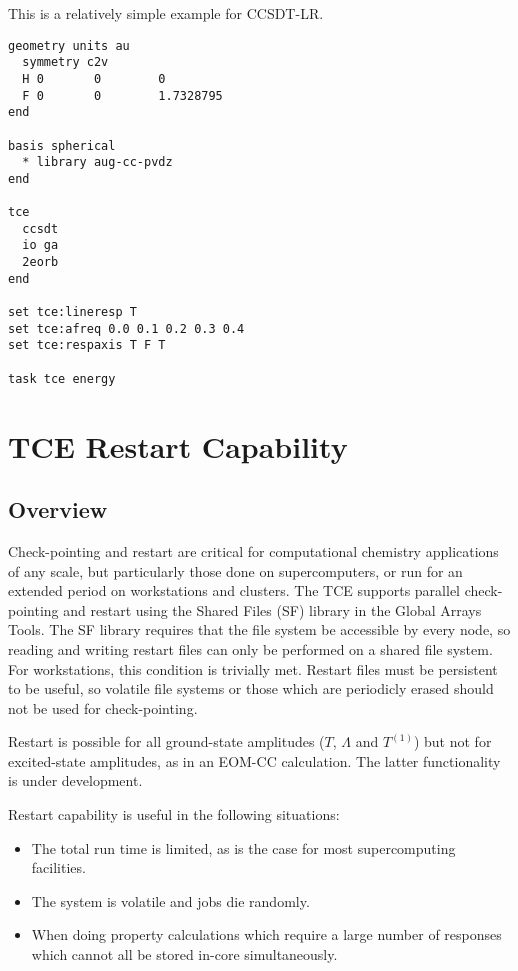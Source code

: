 This is a relatively simple example for CCSDT-LR.

\begin{verbatim}
geometry units au
  symmetry c2v
  H 0       0        0
  F 0       0        1.7328795
end

basis spherical
  * library aug-cc-pvdz
end

tce
  ccsdt
  io ga
  2eorb
end

set tce:lineresp T
set tce:afreq 0.0 0.1 0.2 0.3 0.4
set tce:respaxis T F T

task tce energy
\end{verbatim}

\section{TCE Restart Capability}

\subsection{Overview}

Check-pointing and restart are critical for computational chemistry applications of any scale, but particularly those done on supercomputers, or run for an extended period on workstations and clusters.  The TCE supports parallel check-pointing and restart using the Shared Files (SF) library in the Global Arrays Tools.  The SF library requires that the file system be accessible by every node, so reading and writing restart files can only be performed on a shared file system.  For workstations, this condition is trivially met.  Restart files must be persistent to be useful, so volatile file systems or those which are periodicly erased should not be used for check-pointing.

Restart is possible for all ground-state amplitudes ($T$, $\Lambda$ and $T^{(1)}$) but not for excited-state amplitudes, as in an EOM-CC calculation.  The latter functionality is under development.

Restart capability is useful in the following situations:
\begin{itemize}
 \item The total run time is limited, as is the case for most supercomputing facilities.
 \item The system is volatile and jobs die randomly.
 \item When doing property calculations which require a large number of responses which cannot all be stored in-core simultaneously.
\end{itemize}

